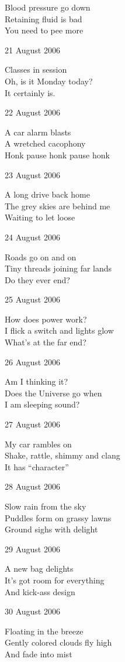 \documentclass[12pt]{article}
\begin{document}
Blood pressure go down \\
Retaining fluid is bad \\
You need to pee more

21 August 2006

Classes in session \\
Oh, is it Monday today? \\
It certainly is.

22 August 2006

A car alarm blasts \\
A wretched cacophony \\
Honk pause honk pause honk

23 August 2006

A long drive back home \\
The grey skies are behind me \\
Waiting to let loose

24 August 2006

Roads go on and on \\
Tiny threads joining far lands \\
Do they ever end?

25 August 2006

How does power work? \\
I flick a switch and lights glow \\
What's at the far end?


\newpage

26 August 2006

Am I thinking it? \\
Does the Universe go when \\
I am sleeping sound?

27 August 2006

My car rambles on \\
Shake, rattle, shimmy and clang \\
It has ``character''

28 August 2006

Slow rain from the sky \\
Puddles form on grassy lawns \\
Ground sighs with delight

29 August 2006

A new bag delights \\
It's got room for everything \\
And kick-ass design

30 August 2006

Floating in the breeze \\
Gently colored clouds fly high \\
And fade into mist
\end{document}
